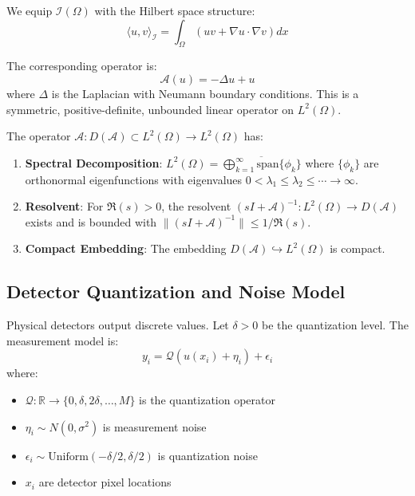 \documentclass[twocolumn,11pt]{article}
\begin{document}
We equip $\mathcal{I}(\Omega)$ with the Hilbert space structure:
\begin{equation}
\langle u, v \rangle_{\mathcal{I}} = \int_\Omega \left( uv + \nabla u \cdot \nabla v \right) dx
\end{equation}

The corresponding operator is:
\begin{equation}
\mathcal{A}(u) = -\Delta u + u
\end{equation}
where $\Delta$ is the Laplacian with Neumann boundary conditions. This is a symmetric, positive-definite, unbounded linear operator on $L^2(\Omega)$.

\begin{lemma}
The operator $\mathcal{A}: D(\mathcal{A}) \subset L^2(\Omega) \to L^2(\Omega)$ has:
\begin{enumerate}
\item \textbf{Spectral Decomposition}: $L^2(\Omega) = \overline{\bigoplus_{k=1}^\infty \text{span}\{\phi_k\}}$ where $\{\phi_k\}$ are orthonormal eigenfunctions with eigenvalues $0 < \lambda_1 \leq \lambda_2 \leq \cdots \to \infty$.
\item \textbf{Resolvent}: For $\Re(s) > 0$, the resolvent $(sI + \mathcal{A})^{-1}: L^2(\Omega) \to D(\mathcal{A})$ exists and is bounded with $\|(sI + \mathcal{A})^{-1}\| \leq 1/\Re(s)$.
\item \textbf{Compact Embedding}: The embedding $D(\mathcal{A}) \hookrightarrow L^2(\Omega)$ is compact.
\end{enumerate}
\end{lemma}

\subsection{Detector Quantization and Noise Model}

Physical detectors output discrete values. Let $\delta > 0$ be the quantization level. The measurement model is:
\begin{equation}
y_i = \mathcal{Q}(u(x_i) + \eta_i) + \epsilon_i
\end{equation}
where:
\begin{itemize}
\item $\mathcal{Q}: \mathbb{R} \to \{0, \delta, 2\delta, \ldots, M\}$ is the quantization operator
\item $\eta_i \sim N(0, \sigma^2)$ is measurement noise
\item $\epsilon_i \sim \text{Uniform}(-\delta/2, \delta/2)$ is quantization noise
\item $x_i$ are detector pixel locations
\end{itemize}
\end{document}
